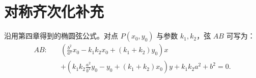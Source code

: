 \chapter{对称齐次化补充}

沿用第四章得到的椭圆弦公式。对点 $P(x_0,y_0)$ 与参数 $k_1,k_2$，弦 $AB$ 可写为：
\begin{align*}
AB:\quad &\left( \frac{b^2}{a^2} x_0-k_1k_2x_0+(k_1+k_2)y_0 \right)x\\
&+\left(k_1k_2\frac{a^2}{b^2}y_0-y_0+(k_1+k_2)x_0\right)y+k_1k_2a^2+b^2=0.
\end{align*}
